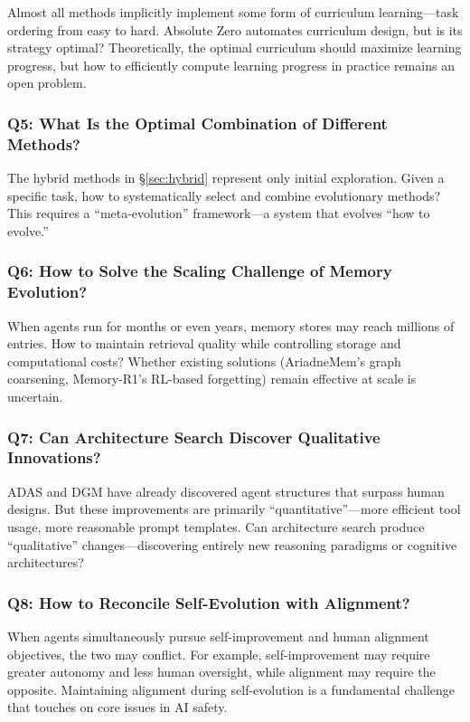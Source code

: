 Almost all methods implicitly implement some form of curriculum learning---task ordering from easy to hard. Absolute Zero automates curriculum design, but is its strategy optimal? Theoretically, the optimal curriculum should maximize learning progress, but how to efficiently compute learning progress in practice remains an open problem.

\subsubsection{Q5: What Is the Optimal Combination of Different Methods?}

The hybrid methods in \S\ref{sec:hybrid} represent only initial exploration. Given a specific task, how to systematically select and combine evolutionary methods? This requires a ``meta-evolution'' framework---a system that evolves ``how to evolve.''

\subsubsection{Q6: How to Solve the Scaling Challenge of Memory Evolution?}

When agents run for months or even years, memory stores may reach millions of entries. How to maintain retrieval quality while controlling storage and computational costs? Whether existing solutions (AriadneMem's graph coarsening, Memory-R1's RL-based forgetting) remain effective at scale is uncertain.

\subsubsection{Q7: Can Architecture Search Discover Qualitative Innovations?}

ADAS and DGM have already discovered agent structures that surpass human designs. But these improvements are primarily ``quantitative''---more efficient tool usage, more reasonable prompt templates. Can architecture search produce ``qualitative'' changes---discovering entirely new reasoning paradigms or cognitive architectures?

\subsubsection{Q8: How to Reconcile Self-Evolution with Alignment?}

When agents simultaneously pursue self-improvement and human alignment objectives, the two may conflict. For example, self-improvement may require greater autonomy and less human oversight, while alignment may require the opposite. Maintaining alignment during self-evolution is a fundamental challenge that touches on core issues in AI safety.

